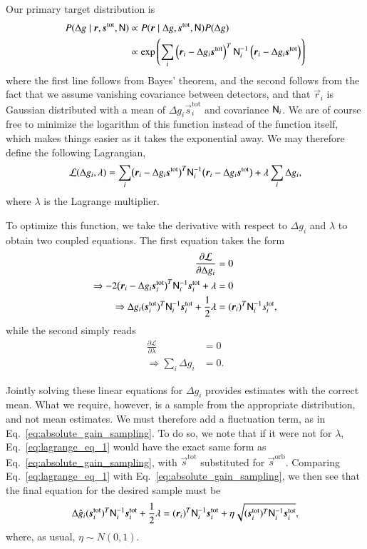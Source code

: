 \documentclass[twocolumn]{aa}
\newcommand{\s}[0]{\vec{s}}
\newcommand{\N}[0]{\tens{N}}
\renewcommand{\r}[0]{\vec{r}}
\newcommand{\tot}[0]{^{\mathrm{tot}}}
\newcommand{\orb}[0]{^{\mathrm{orb}}}
\begin{document}
Our primary target distribution is
\begin{align}
    P(\Delta g \mid \r, \s\tot, \N) &\propto P(\r \mid\Delta g, \s\tot, \N)P(\Delta g) \nonumber \\
    &\propto \exp\left(\sum_i\left(\r_i - \Delta g_i \s^{\mathrm{tot}}\right)^T\N_i^{-1}\left(\r_i - \Delta g_i\s^{\mathrm{tot}}\right)\right)
\end{align}
where the first line follows from Bayes' theorem, and the second
follows from the fact that we assume vanishing covariance between
detectors, and that $\r_i$ is Gaussian distributed with a mean of
$\Delta g_i \s\tot_i$ and covariance $\N_i$. We are of course free to minimize
the logarithm of this function instead of the function itself, which
makes things easier as it takes the exponential away. We may
therefore define the following Lagrangian,
\begin{equation}
    \mathcal{L}(\Delta g_i, \lambda) = \sum_i\bigl(\r_i - \Delta g_i \s^{\mathrm{tot}}\bigr)^T\N_i^{-1}\bigl(\r_i - \Delta g_i\s^{\mathrm{tot}}\bigr) + \lambda\sum_i \Delta g_i,
\end{equation}
where $\lambda$ is the Lagrange multiplier. 

To optimize this function, we take the derivative with respect to
$\Delta g_i$ and $\lambda$ to obtain two coupled equations. The first
equation takes the form
\begin{align}
    \frac{\partial \mathcal{L}}{\partial \Delta g_i}  &= 0 \nonumber \\
    \Rightarrow -2\bigl( \r_i - \Delta g_i\s_i^{\mathrm{tot}}\bigr)^T\N^{-1}_i\s_i^{\mathrm{tot}} + \lambda &= 0 \nonumber \\
    \Rightarrow \Delta g_i (\s_i^{\mathrm{tot}})^T\N^{-1}_i\s_i^{\mathrm{tot}} + \frac{1}{2}\lambda &= (\r_i)^T \N^{-1}_i s_i^{\mathrm{tot}},
    \label{eq:lagrange_eq_1}
\end{align}
while the second simply reads
\begin{align}
    \frac{\partial \mathcal{L}}{\partial \lambda} & = 0 \nonumber \\
    \Rightarrow \sum_i \Delta g_i & = 0.
\end{align}

Jointly solving these linear equations for $\Delta g_i$ provides
estimates with the correct mean. What we require, however, is a sample
from the appropriate distribution, and not mean estimates. We must
therefore add a fluctuation term, as in
Eq.~\eqref{eq:absolute_gain_sampling}. To do so, we note that if it
were not for $\lambda$, Eq.~\eqref{eq:lagrange_eq_1} would have the
exact same form as Eq.~\eqref{eq:absolute_gain_sampling}, with $\s\tot$ substituted for $\s\orb$. Comparing
Eq.~\eqref{eq:lagrange_eq_1} with Eq.~\eqref{eq:absolute_gain_sampling},
we then see that the final equation for the desired sample must be
\begin{equation}
	\Delta\hat{g}_i (\s_i\tot)^T\N^{-1}_i\s_i\tot + \frac{1}{2}\lambda = (\r_i)^T\N_i^{-1}\s_i\tot + \eta\sqrt{(\s\tot_i)^T\N_i^{-1}\s\tot_i},
\end{equation}
where, as usual, $\eta\sim N(0,1)$.
\end{document}
